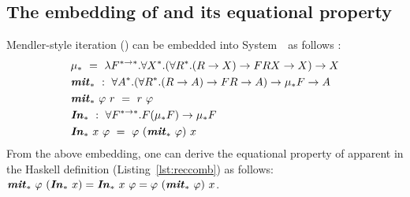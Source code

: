 \subsection{The embedding of \MIt{*} and its equational property}
Mendler-style iteration (\MIt{*}) can be embedded into System~\Fw\ as follows
\cite{AbeMatUus05,AhnShe11}:
\begin{align*}
&\mu_{*} ~=~ \lambda F^{* \to *}.\forall X^{*}.
		(\forall R^{*}.(R \to X) \to F R X \to X) \to X
	\\
&\textbf{\textit{mit}}_{*} ~:~ \forall A^{*}.
	(\forall R^{*}.(R \to A) \to F R \to A) \to \mu_{*} F \to A \\
&\textbf{\textit{mit}}_{*}~\varphi~r ~=~ r~\varphi
	\\
&\textbf{\textit{In}}_{*} ~:~\forall F^{* \to *}.F(\mu_{*} F) \to \mu_{*} F \\
&\textbf{\textit{In}}_{*}~x~\varphi ~=~ \varphi~(\textbf{\textit{mit}}_{*}~\varphi)~x
\end{align*}
From the above embedding, one can derive the equational property of \MIt{*}
apparent in the Haskell definition (Listing~\ref{lst:reccomb}) as follows:
$\textbf{\textit{mit}}_{*}~\varphi~(\textbf{\textit{In}}_{*}~x) = \textbf{\textit{In}}_{*}~x~\varphi = \varphi~(\textbf{\textit{mit}}_{*}~\varphi)~x$.

